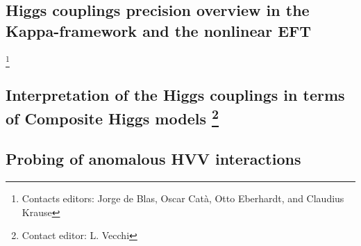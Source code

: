 \documentclass[../report.tex]{subfiles}
\providecommand{\main}{..}
\begin{document}
%
 
\subsection{Higgs couplings precision overview in the Kappa-framework and the nonlinear EFT}\label{sec2:theo_kappa_EFT}
\footnote{Contacts editors: Jorge de Blas, Oscar Cat\`a, Otto Eberhardt, and Claudius Krause} 


%

\subsection{Interpretation of the Higgs couplings in terms of Composite Higgs models \footnote{Contact editor: L. Vecchi}\label{sec9:CHM}} 



\subsection[Probing of anomalous HVV interactions]{Probing of anomalous HVV interactions}
\label{sec2:anomalous_HVV}



\clearpage

\end{document}
